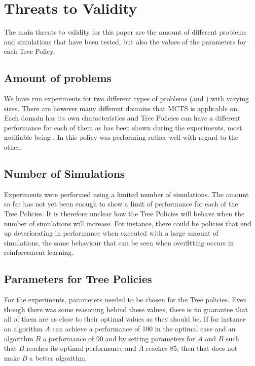 \section{Threats to Validity}
The main threats to validity for this paper are the amount of different problems and simulations that have been tested, but also the values of the parameters for each Tree Policy. 

\subsection{Amount of problems}
We have run experiments for two different types of problems (\rock and \poc) with varying sizes. There are however many different domains that MCTS is applicable on. Each domain has its own characteristics and Tree Policies can have a different performance for each of them as has been shown during the experiments, most notifiable being \eroulette. In \rock this policy was performing rather well with regard to the other.

\subsection{Number of Simulations}
Experiments were performed using a limited number of simulations. The amount so far has not yet been enough to show a limit of performance for each of the Tree Policies. It is therefore unclear how the Tree Policies will behave when the number of simulations will increase. For instance, there could be policies that end up deteriorating in performance when executed with a large amount of simulations, the same behaviour that can be seen when overfitting occurs in reinforcement learning.

\subsection{Parameters for Tree Policies}
For the experiments, parameters needed to be chosen for the Tree policies. Even though there was some reasoning behind these values, there is no guarantee that all of them are as close to their optimal values as they should be. If for instance an algorithm $A$ can achieve a performance of 100 in the optimal case and an algorithm $B$ a performance of 90 and by setting parameters for $A$ and $B$ such that $B$ reaches its optimal performance and $A$ reaches 85, then that does not make $B$ a better algorithm.